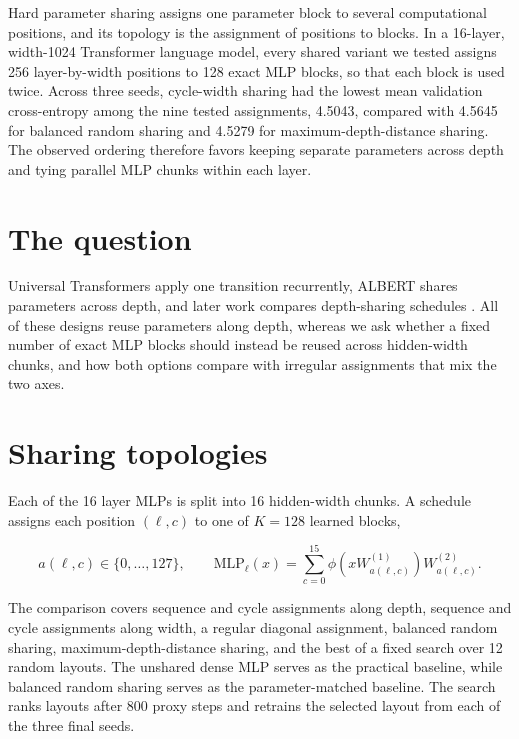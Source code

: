 \documentclass[11pt]{article}
\begin{document}

\begin{publicationhead}
\makepublicationtitle
\end{publicationhead}

Hard parameter sharing assigns one parameter block to several computational positions, and its topology is the assignment of positions to blocks. In a 16-layer, width-1024 Transformer language model, every shared variant we tested assigns 256 layer-by-width positions to 128 exact MLP blocks, so that each block is used twice. Across three seeds, cycle-width sharing had the lowest mean validation cross-entropy among the nine tested assignments, 4.5043, compared with 4.5645 for balanced random sharing and 4.5279 for maximum-depth-distance sharing. The observed ordering therefore favors keeping separate parameters across depth and tying parallel MLP chunks within each layer.

\section{The question}\label{question}

Universal Transformers apply one transition recurrently, ALBERT shares parameters across depth, and later work compares depth-sharing schedules \cite{dehghani2018,lan2019,takase2021}. All of these designs reuse parameters along depth, whereas we ask whether a fixed number of exact MLP blocks should instead be reused across hidden-width chunks, and how both options compare with irregular assignments that mix the two axes.

\section{Sharing topologies}\label{topologies}

Each of the 16 layer MLPs is split into 16 hidden-width chunks. A schedule assigns each position \((\ell,c)\) to one of \(K=128\) learned blocks,

\[
a(\ell,c)\in\{0,\ldots,127\},
\qquad
\mathrm{MLP}_{\ell}(x)
=\sum_{c=0}^{15}
\phi\!\left(xW^{(1)}_{a(\ell,c)}\right)
W^{(2)}_{a(\ell,c)}.
\]

The comparison covers sequence and cycle assignments along depth, sequence and cycle assignments along width, a regular diagonal assignment, balanced random sharing, maximum-depth-distance sharing, and the best of a fixed search over 12 random layouts. The unshared dense MLP serves as the practical baseline, while balanced random sharing serves as the parameter-matched baseline. The search ranks layouts after 800 proxy steps and retrains the selected layout from each of the three final seeds.
\end{document}
